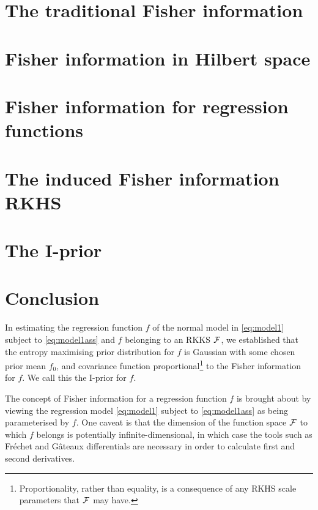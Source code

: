 \documentclass[11pt,twoside,openright]{report}
\begin{document}
\section{The traditional Fisher information}


\section{Fisher information in Hilbert space}
\label{sec:fihilbert}


\section{Fisher information for regression functions}
\label{sec:firegfun}


\section{The induced Fisher information RKHS}
\label{sec:inducedFisherRKHS}


\section{The I-prior}


\section{Conclusion}

\label{errata3}
In estimating the regression function $f$ of the normal model in \cref{eq:model1} subject to \cref{eq:model1ass} and $f$ belonging to an RKKS ${\mathcal F}$, we established that the entropy maximising prior distribution for $f$ is Gaussian with some chosen prior mean $f_0$, and covariance function proportional\footnote{Proportionality, rather than equality, is a consequence of any RKHS scale parameters that ${\mathcal F}$ may have.} to the Fisher information for $f$.
We call this the I-prior for $f$.

The concept of Fisher information for a regression function $f$ is brought about by viewing the regression model \cref{eq:model1} subject to \cref{eq:model1ass} as being parameterised by $f$.
One caveat is that the dimension of the function space ${\mathcal F}$ to which $f$ belongs is potentially infinite-dimensional, in which case the tools such as Fréchet and Gâteaux differentials are necessary in order to calculate first and second derivatives.
\end{document}
